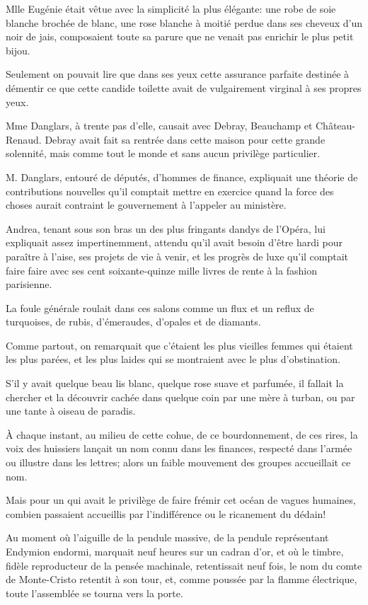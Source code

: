 Mlle Eugénie était vêtue avec la simplicité la plus élégante: une robe de soie blanche brochée de blanc, une rose blanche à moitié perdue dans ses cheveux d'un noir de jais, composaient toute sa parure que ne venait pas enrichir le plus petit bijou. 

Seulement on pouvait lire que dans ses yeux cette assurance parfaite destinée à démentir ce que cette candide toilette avait de vulgairement virginal à ses propres yeux. 

Mme Danglars, à trente pas d'elle, causait avec Debray, Beauchamp et Château-Renaud. Debray avait fait sa rentrée dans cette maison pour cette grande solennité, mais comme tout le monde et sans aucun privilège particulier. 

M. Danglars, entouré de députés, d'hommes de finance, expliquait une théorie de contributions nouvelles qu'il comptait mettre en exercice quand la force des choses aurait contraint le gouvernement à l'appeler au ministère. 

Andrea, tenant sous son bras un des plus fringants dandys de l'Opéra, lui expliquait assez impertinemment, attendu qu'il avait besoin d'être hardi pour paraître à l'aise, ses projets de vie à venir, et les progrès de luxe qu'il comptait faire faire avec ses cent soixante-quinze mille livres de rente à la fashion parisienne. 

La foule générale roulait dans ces salons comme un flux et un reflux de turquoises, de rubis, d'émeraudes, d'opales et de diamants. 

Comme partout, on remarquait que c'étaient les plus vieilles femmes qui étaient les plus parées, et les plus laides qui se montraient avec le plus d'obstination. 

S'il y avait quelque beau lis blanc, quelque rose suave et parfumée, il fallait la chercher et la découvrir cachée dans quelque coin par une mère à turban, ou par une tante à oiseau de paradis. 

À chaque instant, au milieu de cette cohue, de ce bourdonnement, de ces rires, la voix des huissiers lançait un nom connu dans les finances, respecté dans l'armée ou illustre dans les lettres; alors un faible mouvement des groupes accueillait ce nom. 

Mais pour un qui avait le privilège de faire frémir cet océan de vagues humaines, combien passaient accueillis par l'indifférence ou le ricanement du dédain! 

Au moment où l'aiguille de la pendule massive, de la pendule représentant Endymion endormi, marquait neuf heures sur un cadran d'or, et où le timbre, fidèle reproducteur de la pensée machinale, retentissait neuf fois, le nom du comte de Monte-Cristo retentit à son tour, et, comme poussée par la flamme électrique, toute l'assemblée se tourna vers la porte. 

